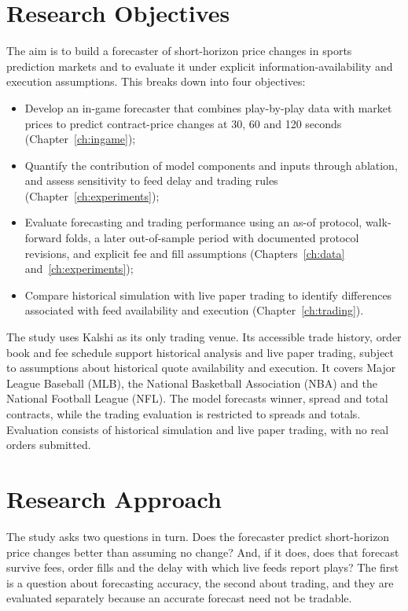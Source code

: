 \documentclass[12pt,a4paper,oneside]{report}
\begin{document}
\section{Research Objectives}
The aim is to build a forecaster of short-horizon price changes in sports
prediction markets and to evaluate it under explicit information-availability and
execution assumptions. This breaks down
into four objectives:
\begin{itemize}
  \item Develop an in-game forecaster that combines play-by-play data with market
        prices to predict contract-price changes at 30, 60 and 120 seconds
        (Chapter~\ref{ch:ingame});
  \item Quantify the contribution of model components and inputs through ablation,
        and assess sensitivity to feed delay and trading rules
        (Chapter~\ref{ch:experiments});
  \item Evaluate forecasting and trading performance using an as-of protocol,
        walk-forward folds, a later out-of-sample period with documented protocol revisions,
        and explicit fee and fill assumptions
        (Chapters~\ref{ch:data} and~\ref{ch:experiments});
  \item Compare historical simulation with live paper trading to identify
        differences associated with feed availability and execution
        (Chapter~\ref{ch:trading}).
\end{itemize}

The study uses Kalshi as its only trading venue. Its accessible trade history,
order book and fee schedule support historical analysis and live paper trading,
subject to assumptions about historical quote availability and execution. It covers
Major League Baseball (MLB), the National Basketball Association (NBA) and the
National Football League (NFL). The model forecasts winner, spread and total
contracts, while the trading evaluation is restricted to spreads and totals.
Evaluation consists of historical simulation and live paper trading, with no real
orders submitted.

\section{Research Approach}\label{sec:approach}
The study asks two questions in turn. Does the forecaster predict short-horizon
price changes better than assuming no change? And, if it does, does that forecast
survive fees, order fills and the delay with which live feeds report plays? The
first is a question about forecasting accuracy, the second about trading, and
they are evaluated separately because an accurate forecast need not be tradable.
\end{document}
